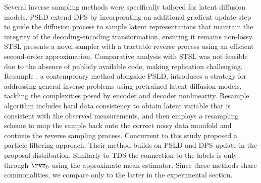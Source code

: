 Several inverse sampling methods were specifically tailored for latent diffusion models. 
PSLD \cite{rout2024solving} extend DPS \cite{chungdiffusion} by incorporating an additional gradient update step to guide the diffusion process to sample latent representations that maintain the integrity of the decoding-encoding transformation, ensuring it remains non-lossy.
STSL \cite{rout2024beyond} presents a novel sampler with a tractable reverse process using an efficient second-order approximation. 
Comparative analysis with STSL was not feasible due to the absence of publicly available code, making replication challenging.
Resample \cite{song2023solving}, a contemporary method alongside PSLD, introduces a strategy for addressing general inverse problems using pretrained latent diffusion models, tackling the complexities posed by encoder and decoder nonlinearity.
Resample algorithm includes hard data consistency to obtain latent variable that is consistent with the observed measurements, and then employs a resampling scheme to map the sample back onto the correct noisy data manifold and continue the reverse sampling process. 
Concurrent to this study \citet{nazemi2024particle} proposed a particle filtering approach. Their method builds on PSLD and DPS update in the proposal distribution. Similarly to TDS \cite{wu2024practical} the connection to the labels is only through $\rvz_0$ using the approximate mean estimator. Since these methods share commonalities, we compare only to the latter in the experimental section. 






